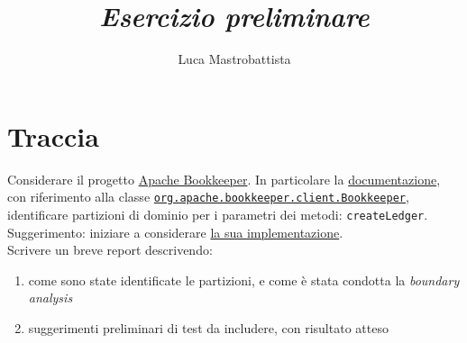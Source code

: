 \documentclass[a4paper, 12pt]{article}
\newcommand{\key}[1]{\texttt{#1}}
\begin{document}
\sloppy
  
\title{
  \textbf{
    \emph{Esercizio preliminare}
  }
}  
\author{Luca Mastrobattista}
\date{}
\maketitle

\tableofcontents

\newpage
\section{Traccia}
Considerare il progetto \href{https://github.com/apache/bookkeeper}{Apache Bookkeeper}. In particolare la \href{http://bookkeeper.apache.org/docs/4.10.0/development/protocol/}{documentazione}, con riferimento alla classe \href{https://github.com/apache/bookkeeper/blob/e7430ce25e3609bf77b028e4f0475dad2147c22d/bookkeeper-server/src/main/java/org/apache/bookkeeper/client/BookKeeper.java}{\key{org.apache.bookkeeper.client.Bookkeeper}}, identificare partizioni di dominio per i parametri dei metodi: \key{createLedger}.\\

Suggerimento: iniziare a considerare \href{https://github.com/apache/bookkeeper/blob/e7430ce25e3609bf77b028e4f0475dad2147c22d/bookkeeper-server/src/main/java/org/apache/bookkeeper/client/BookKeeper.java#L887}{la sua implementazione}.\\
 
\noindent Scrivere un breve report descrivendo:
\begin{enumerate}
\item come sono state identificate le partizioni, e come è stata condotta la \textit{boundary analysis}
\item suggerimenti preliminari di test da includere, con risultato atteso
\end{enumerate}
\end{document}
